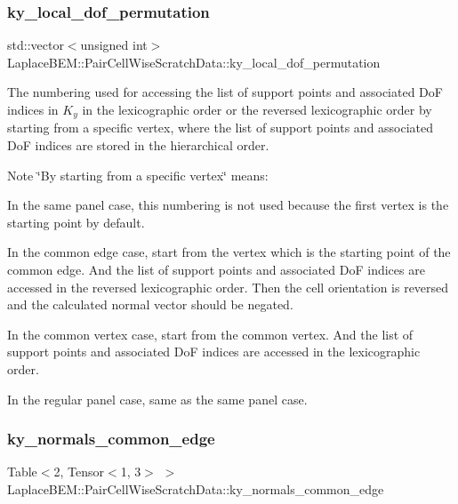 \subsubsection{\texorpdfstring{ky\+\_\+local\+\_\+dof\+\_\+permutation}{ky\_local\_dof\_permutation}}
{\footnotesize\ttfamily std\+::vector$<$unsigned int$>$ Laplace\+B\+E\+M\+::\+Pair\+Cell\+Wise\+Scratch\+Data\+::ky\+\_\+local\+\_\+dof\+\_\+permutation}

The numbering used for accessing the list of support points and associated DoF indices in $K_y$ in the lexicographic order or the reversed lexicographic order by starting from a specific vertex, where the list of support points and associated DoF indices are stored in the hierarchical order.


\begin{DoxyDescription}
\item[Note ]\char`\"{}\+By starting from a specific vertex\char`\"{} means\+:
\begin{DoxyEnumerate}
\item In the same panel case, this numbering is not used because the first vertex is the starting point by default.
\item In the common edge case, start from the vertex which is the starting point of the common edge. And the list of support points and associated DoF indices are accessed in the reversed lexicographic order. Then the cell orientation is reversed and the calculated normal vector should be negated.
\item In the common vertex case, start from the common vertex. And the list of support points and associated DoF indices are accessed in the lexicographic order.
\item In the regular panel case, same as the same panel case. 
\end{DoxyEnumerate}
\end{DoxyDescription}\mbox{\label{structLaplaceBEM_1_1PairCellWiseScratchData_a428bf1cd494daa754755bf8905742fbc}} 
\subsubsection{\texorpdfstring{ky\+\_\+normals\+\_\+common\+\_\+edge}{ky\_normals\_common\_edge}}
{\footnotesize\ttfamily Table$<$2, Tensor$<$1, 3$>$ $>$ Laplace\+B\+E\+M\+::\+Pair\+Cell\+Wise\+Scratch\+Data\+::ky\+\_\+normals\+\_\+common\+\_\+edge}

